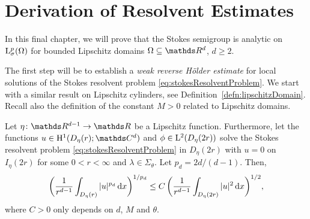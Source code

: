 \chapter{Derivation of Resolvent Estimates}

In this final chapter, we will prove that the Stokes semigroup is analytic on $\mathrm{L}^p_\sigma(\Omega)$ for bounded Lipschitz domains $\Omega \subseteq \R^d$, $d \geq 2$.

The first step will be to establish a \emph{weak reverse Hölder estimate} for local solutions of the Stokes resolvent problem \eqref{eq:stokesResolventProblem}. 
We start with a similar result on Lipschitz cylinders, see Definition~\ref{defn:lipschitzDomain}.
Recall also the definition of the constant $M > 0$ related to Lipschitz domains.

\begin{lem}
  \label{lem:reverseHoelderCylinder}
  Let $\eta \colon \R^{d - 1} \to \R$ be a Lipschitz function.
  Furthermore, let the functions $u \in \HH^1(D_\eta(r); \C^d)$ and $\phi \in \mathrm{L}^2(D_\eta(2r))$ solve the Stokes resolvent problem \eqref{eq:stokesResolventProblem} in $D_\eta(2r)$ with $u = 0$ on $I_\eta(2r)$ for some $0 < r < \infty$ and $\lambda \in \Sigma_\theta$.
  Let $p_d = {2d}/(d - 1)$.
  Then,
  \begin{align}
    \label{eq:reverseHoelderCylinder}
    \bigg( \frac{1}{r^{d -1 }}\int_{D_\eta(r)} |u|^{p_d} \, {\operatorname{d}\!{x}} \bigg)^{1/p_d} \leq C \, \bigg( \frac{1}{r^{d - 1}} \int_{D_\eta(2r)} |u|^2 \, {\operatorname{d}\!{x}} \bigg)^{1/2},
  \end{align}
  where $C > 0$ only depends on $d$, $M$ and $\theta$.
\end{lem}

